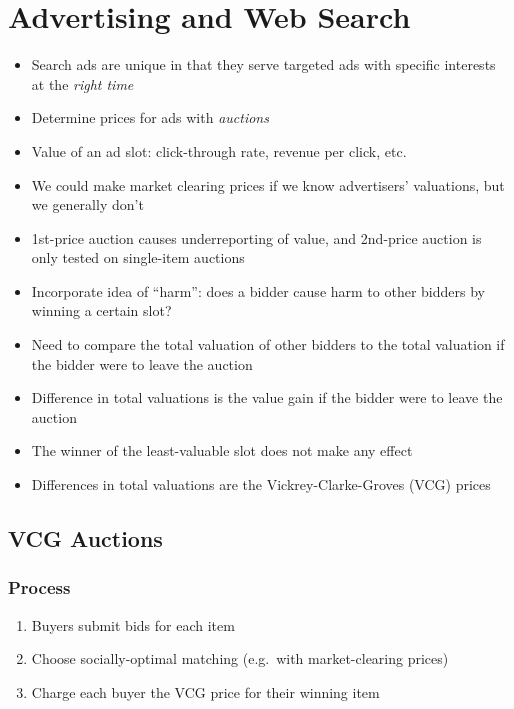 \chapter{Advertising and Web Search}

\begin{itemize}
    \item Search ads are unique in that they serve targeted ads with specific interests at the \emph{right time}
    \item Determine prices for ads with \emph{auctions}
    \item Value of an ad slot: click-through rate, revenue per click, etc.
    \item We could make market clearing prices if we know advertisers' valuations, but we generally don't
    \item 1st-price auction causes underreporting of value, and 2nd-price auction is only tested on single-item auctions
    \item Incorporate idea of ``harm'': does a bidder cause harm to other bidders by winning a certain slot?
    \item Need to compare the total valuation of other bidders to the total valuation if the bidder were to leave the auction
    \item Difference in total valuations is the value gain if the bidder were to leave the auction
    \item The winner of the least-valuable slot does not make any effect
    \item Differences in total valuations are the Vickrey-Clarke-Groves (VCG) prices
\end{itemize}

\section{VCG Auctions}

\subsection{Process}
\begin{enumerate}
    \item Buyers submit bids for each item
    \item Choose socially-optimal matching (e.g.\ with market-clearing prices)
    \item Charge each buyer the VCG price for their winning item
\end{enumerate}

